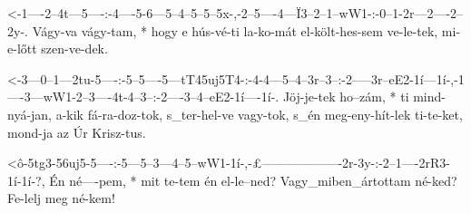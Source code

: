   {<-1----2--4t---5----:-4----5-6---5--4--5--5--5x-,-2--5----4---Ï3--2--1--wW1-:-0--1-2r---2----2--2y-.}
  {  Vágy-va vágy-tam, * hogy e hús-vé-ti la-ko-mát  el-költ-hes-sem ve-le-tek,  mi-e-lőtt szen-ve-dek.}



  {<-3---0--1---2tu-5----:-5--5----5---tT45uj5T4-:-4-4---5--4--3r--3--:-2-----3r--eE2-1í---1í-,-1----3---wW1-2--3----4t-4--3--:-2----3--4--eE2-1í----1í-.}
  {  Jöj-je-tek ho--zám, * ti mind-nyá-jan,        a-kik fá-ra-doz-tok, s_ter-hel-ve  vagy-tok, s_én meg-eny-hít-lek ti-te-ket, mond-ja az Úr  Krisz-tus.}


  {<ô-5tg3-56uj5-5----:-5---5--3---4--5--wW1-1í-,-£-------------------2r-3y-:-2--1----2rR3-1í-1í-?,}
  {   Én   né----pem, * mit te-tem én el-le--ned? Vagy_miben_ártottam né-ked? Fe-lelj meg  né-kem!}